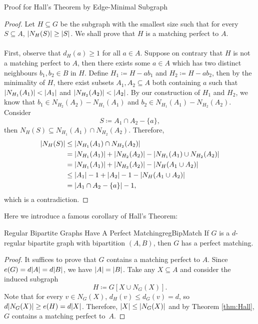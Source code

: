\documentclass[math, code]{amznotes}
\theoremstyle{remark}
\begin{document}
\begin{genbox}{Proof for Hall's Theorem by Edge-Minimal Subgraph}
    \begin{proof}
        Let $H \subseteq G$ be the subgraph with the smallest size such that for every $S \subseteq A$, ${\left\lvert {N_H(S)} \right\rvert} \geq {\left\lvert {S} \right\rvert}$. We shall prove that $H$ is a matching perfect to $A$.
        \\\\
        First, observe that $d_H(a) \geq 1$ for all $a \in A$. Suppose on contrary that $H$ is not a matching perfect to $A$, then there exists some $a \in A$ which has two distinct neighbours $b_1, b_2 \in B$ in $H$. Define $H_1 \coloneqq H - ab_1$ and $H_2 \coloneqq H - ab_2$, then by the minimality of $H$, there exist subsets $A_1, A_2 \subseteq A$ both containing $a$ such that~${\left\lvert {N_{H_1}(A_1)} \right\rvert} < {\left\lvert {A_1} \right\rvert}$ and ${\left\lvert {N_{H_2}(A_2)} \right\rvert} < {\left\lvert {A_2} \right\rvert}$. By our construction of $H_1$ and $H_2$, we know that $b_1 \in N_{H_2}(A_2) - N_{H_1}(A_1)$ and $b_2 \in N_{H_1}(A_1) - N_{H_2}(A_2)$. Consider 
        \begin{equation*}
            S \coloneqq A_1 \cap A_2 - \{a\},
        \end{equation*}
        then $N_H(S) \subseteq N_{H_1}(A_1) \cap N_{H_2}(A_2)$. Therefore,
        \begin{align*}
            {\left\lvert {N_H(S)} \right\rvert} & \leq {\left\lvert {N_{H_1}(A_1) \cap N_{H_2}(A_2)} \right\rvert} \\
            & = {\left\lvert {N_{H_1}(A_1)} \right\rvert} + {\left\lvert {N_{H_2}(A_2)} \right\rvert} - {\left\lvert {N_{H_1}(A_1) \cup N_{H_2}(A_2)} \right\rvert} \\
            & = {\left\lvert {N_{H_1}(A_1)} \right\rvert} + {\left\lvert {N_{H_2}(A_2)} \right\rvert} - {\left\lvert {N_{H}(A_1 \cup A_2)} \right\rvert} \\
            & \leq {\left\lvert {A_1} \right\rvert} - 1 + {\left\lvert {A_2} \right\rvert} - 1 - {\left\lvert {N_{H}(A_1 \cup A_2)} \right\rvert} \\
            & = {\left\lvert {A_1 \cap A_2 - \{a\}} \right\rvert} - 1,
        \end{align*}
        which is a contradiction.
    \end{proof}
\end{genbox}
Here we introduce a famous corollary of Hall's Theorem:
\begin{corbox}{Regular Bipartite Graphs Have A Perfect Matching}{regBipMatch}
    If $G$ is a $d$-regular bipartite graph with bipartition $(A, B)$, then $G$ has a perfect matching.
    \tcblower
    \begin{proof}
        It suffices to prove that $G$ contains a matching perfect to $A$. Since $e(G) = d{\left\lvert {A} \right\rvert} = d{\left\lvert {B} \right\rvert}$, we have ${\left\lvert {A} \right\rvert} = {\left\lvert {B} \right\rvert}$. Take any $X \subseteq A$ and consider the induced subgraph 
        \begin{equation*}
            H \coloneqq G[X \cup N_G(X)].
        \end{equation*}
        Note that for every $v \in N_G(X)$, $d_H(v) \leq d_G(v) = d$, so $d{\left\lvert {N_G(X)} \right\rvert} \geq e(H) = d{\left\lvert {X} \right\rvert}$. Therefore, ${\left\lvert {X} \right\rvert} \leq {\left\lvert {N_G(X)} \right\rvert}$ and by Theorem \ref{thm:Hall}, $G$ contains a matching perfect to~$A$.
    \end{proof}
\end{corbox}
\end{document}
